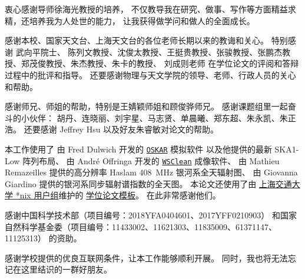 
\begin{thanks}

衷心感谢导师徐海光教授的培养，
不仅教导我在研究、做事、写作等方面精益求精，还培养我为人处世的能力，
让我获得做学问和做人的全面成长。

感谢本校、国家天文台、上海天文台的各位老师长期以来的教诲和关心。
特别感谢
武向平院士、
陈列文教授、沈俊太教授、王挺贵教授、张骏教授、张鹏杰教授、郑茂俊教授、朱杰教授、朱卡的教授、
刘成则老师
在学位论文的评阅和答辩过程中的批评和指导。
还要感谢物理与天文学院的领导、老师、行政人员的关心和帮助。

感谢师兄、师姐的帮助，特别是王婧颖师姐和顾俊骅师兄。
感谢课题组里一起奋斗的小伙伴：
胡丹、连晓丽、刘宇星、马志贤、单晨曦、郑东超、朱永凯、朱正浩。
还要感谢 Jeffrey Hsu 以及好友朱睿敏对论文的帮助。

本工作使用了
由 Fred Dulwich 开发的
\href{https://github.com/OxfordSKA/OSKAR}{\texttt{OSKAR}} 模拟软件
以及他提供的最新 SKA1-Low 阵列布局、
由 André Offringa 开发的
\href{https://sourceforge.net/projects/wsclean/}{\texttt{WSClean}} 成像软件、
由 Mathieu Remazeilles 提供的高分辨率 Haslam \SI{408}{\MHz} 银河系全天辐射图、
由 Giovanna Giardino 提供的银河系同步辐射谱指数的全天图。
本论文还使用了由%
\href{http://sjtug.org/}{上海交通大学 *nix 用户组}维护的
\href{https://github.com/sjtug/SJTUThesis}{\XeLaTeX{} 学位论文模板}。
在此非常感谢他们。

感谢中国科学技术部（项目编号：2018YFA0404601、2017YFF0210903）
和国家自然科学基金委（项目编号：11433002、11621303、11835009、61371147、11125313）
的资助。

感谢学校提供的优良互联网条件，让本工作能够顺利开展。
同时，我也将无法忘记在这里结识的一群好朋友。


\end{thanks}
